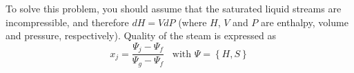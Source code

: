 \documentclass[calculator,steamtables,refrigeranttables]{exam}
\newcommand{\frc}{\displaystyle\frac}
\begin{document}
\begin{question}
To solve this problem, you should assume that the saturated liquid streams are incompressible, and therefore $dH = VdP$ (where $H$, $V$ and $P$ are enthalpy, volume and pressure, respectively). Quality of the steam is expressed as
\begin{displaymath}
x_{j} = \frc{\Psi_{j}-\Psi_{f}}{\Psi_{g}-\Psi_{f}}\;\;\;\text{with }\Psi=\left\{H,S\right\}
\end{displaymath}

\end{question}


\clearpage

\begin{question} \vspace{-2\baselineskip}

\end{question}

\clearpage


\begin{question}\vspace{-2\baselineskip}

\end{question}


\clearpage
\end{document}
